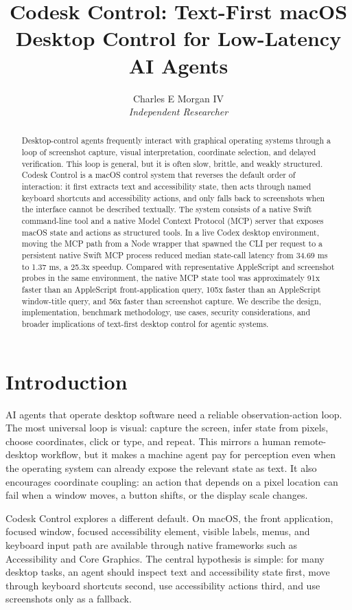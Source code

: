 \documentclass[11pt]{article}
\title{Codesk Control: Text-First macOS Desktop Control for Low-Latency AI Agents}
\author{Charles E Morgan IV\\
\textit{Independent Researcher}}
\date{}
\begin{document}
\maketitle

\begin{abstract}
Desktop-control agents frequently interact with graphical operating systems through a loop of screenshot capture, visual interpretation, coordinate selection, and delayed verification. This loop is general, but it is often slow, brittle, and weakly structured. Codesk Control is a macOS control system that reverses the default order of interaction: it first extracts text and accessibility state, then acts through named keyboard shortcuts and accessibility actions, and only falls back to screenshots when the interface cannot be described textually. The system consists of a native Swift command-line tool and a native Model Context Protocol (MCP) server that exposes macOS state and actions as structured tools. In a live Codex desktop environment, moving the MCP path from a Node wrapper that spawned the CLI per request to a persistent native Swift MCP process reduced median state-call latency from 34.69 ms to 1.37 ms, a 25.3x speedup. Compared with representative AppleScript and screenshot probes in the same environment, the native MCP state tool was approximately 91x faster than an AppleScript front-application query, 105x faster than an AppleScript window-title query, and 56x faster than screenshot capture. We describe the design, implementation, benchmark methodology, use cases, security considerations, and broader implications of text-first desktop control for agentic systems.
\end{abstract}

\section{Introduction}

AI agents that operate desktop software need a reliable observation-action loop. The most universal loop is visual: capture the screen, infer state from pixels, choose coordinates, click or type, and repeat. This mirrors a human remote-desktop workflow, but it makes a machine agent pay for perception even when the operating system can already expose the relevant state as text. It also encourages coordinate coupling: an action that depends on a pixel location can fail when a window moves, a button shifts, or the display scale changes.

Codesk Control explores a different default. On macOS, the front application, focused window, focused accessibility element, visible labels, menus, and keyboard input path are available through native frameworks such as Accessibility and Core Graphics. The central hypothesis is simple: for many desktop tasks, an agent should inspect text and accessibility state first, move through keyboard shortcuts second, use accessibility actions third, and use screenshots only as a fallback.
\end{document}
